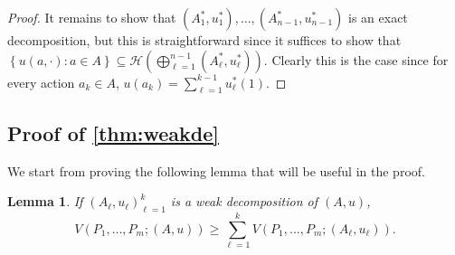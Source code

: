 \documentclass[11pt]{article}
\theoremstyle{plain}
\newtheorem{lem}{Lemma}
\theoremstyle{remark}
\begin{document}
\begin{proof}
It remains to show that $(A_1^*, u_1^*), \ldots , (A_{n- 1}^*, u_{n -1}^*)$ is an exact decomposition, but this is straightforward since it suffices to show that $\left\{u(a, \cdot): a \in A\right\} \subseteq \mathcal{H}\left(\bigoplus_{\ell = 1}^{n- 1} (A_{\ell}^*, u_\ell^*) \right)$.
Clearly this is the case since for every action $a_k \in A$, $u(a_k) = \sum_{\ell = 1}^{k - 1} u_\ell^*(1).$
\end{proof}



\subsection{Proof of \autoref{thm:weakde}}\label{proof:weakde}
We start from proving the following lemma that will be useful in the proof.
\begin{lem}\label{lem:weakde}
If $(A_\ell,u_\ell)_{\ell=1}^k$ is a weak decomposition of $(A,u)$,
\[V(P_1, \ldots , P_m; (A,u)) \geq \sum_{\ell = 1}^{k} V(P_1,...,P_m; (A_\ell,u_\ell)).\]
\end{lem}
\end{document}

